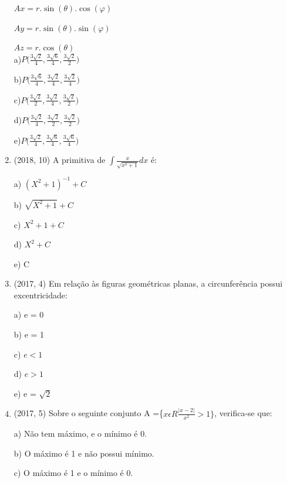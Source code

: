 \documentclass{article}
\begin{document}
\begin{enumerate}
$Ax = r . \sin{(\theta)}.\cos{(\varphi)}$

$Ay= r.\sin{(\theta)}.\sin{(\varphi)}$

$Az = r.\cos{(\theta)}$\\

a)$P\bigg(\frac{3\sqrt{2}}{4}, \frac{3\sqrt{6}}{4}, \frac{3\sqrt{2}}{2} \bigg) $

b)$P\bigg(\frac{3\sqrt{6}}{4}, \frac{3\sqrt{2}}{4}, \frac{3\sqrt{2}}{4} \bigg) $

c)$P\bigg(\frac{3\sqrt{2}}{2}, \frac{3\sqrt{2}}{4}, \frac{3\sqrt{2}}{2} \bigg) $

d)$P\bigg(\frac{3\sqrt{2}}{4}, \frac{3\sqrt{2}}{2}, \frac{3\sqrt{2}}{2} \bigg) $

e)$P\bigg(\frac{3\sqrt{2}}{4}, \frac{3\sqrt{6}}{4}, \frac{3\sqrt{6}}{4} \bigg) $\newline





\item (2018, 10) A primitiva de $\int \frac{x}{\sqrt{x^2 +1}} dx $ é:\newline

a) $(X^2 + 1)^{-1} + C$

b) $\sqrt{X^2 + 1} + C$

c) $X^2 + 1 + C$

d) $X^2 + C$ 

e) C\newline



\item (2017, 4) Em relação às figuras geométricas planas, a circunferência possui excentricidade:

a) e = 0

b) e = 1

c) $e < 1$

d) $e > 1$

e) e = $\sqrt{2}$\newline






\item (2017, 5) Sobre o seguinte conjunto A =\{$x  \epsilon R \frac{|x-2|}{x^2}>1\}$, verifica-se que:\newline

a) Não tem máximo, e o mínimo é 0.

b) O máximo é 1 e não possui mínimo.

c) O máximo é 1 e o mínimo é 0.


\end{enumerate}
\end{document}
